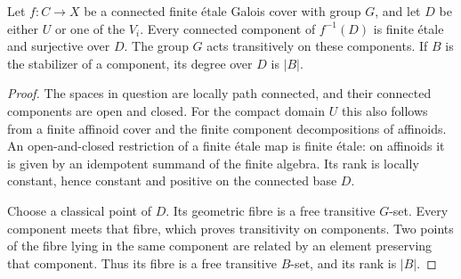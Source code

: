 \begin{lemma}\label{lem:components}
Let $f:C\to X$ be a connected finite \'etale Galois cover with group
$G$, and let $D$ be either $U$ or one of the $V_i$. Every connected
component of $f^{-1}(D)$ is finite \'etale and surjective over $D$.
The group $G$ acts transitively on these components. If $B$ is the
stabilizer of a component, its degree over $D$ is $|B|$.
\end{lemma}
\begin{proof}
The spaces in question are locally path connected, and their connected
components are open and closed. For the compact domain $U$ this also
follows from a finite affinoid cover and the finite component
decompositions of affinoids. An open-and-closed restriction of a finite
\'etale map is finite \'etale: on affinoids it is given by an idempotent
summand of the finite algebra. Its rank is locally constant, hence
constant and positive on the connected base $D$.

Choose a classical point of $D$. Its geometric fibre is a free
transitive $G$-set. Every component meets that fibre, which proves
transitivity on components. Two points of the fibre lying in the
same component are related by an element preserving that component.
Thus its fibre is a free transitive $B$-set, and its rank is $|B|$.
\end{proof}

